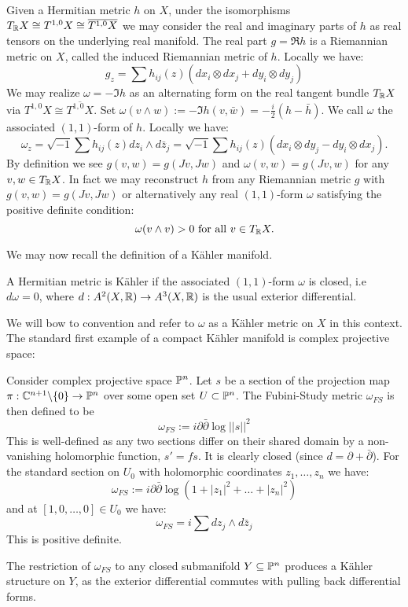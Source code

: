 Given a Hermitian metric \(h\) on \(X\), under the isomorphisms \(T_{\mathbb{R}} X \cong T^{1,0}X \cong \overline{T^{1,0}X}\) we may consider the real and imaginary parts of \(h\) as real tensors on the underlying real manifold. The real part \(g = \Re h\) is a Riemannian metric on \(X\), called the induced Riemannian metric of \(h\). Locally we have:
\[
g_z = \sum h_{ij}(z) ( dx_i \otimes d x_j + dy_i \otimes dy_j)
\]
We may realize \(\omega = - \Im h\) as an alternating form on the real tangent bundle \(T_{\mathbb{R}} X\) via \(T^{1,0}X \cong \overline{T^{1,0}X}\). Set \(\omega ( v \wedge w ) :=  - \Im h(v, \bar{w}) = - \frac{i}{2} ( h - \bar{h} )  \). We call \(\omega\) the associated \((1,1)\)-form of \(h\). Locally we have:
\[
\omega_z = \sqrt{-1} \sum h_{ij}(z) dz_i \wedge d\bar{z}_j = \sqrt{-1} \sum h_{ij}(z) ( dx_i \otimes dy_j - dy_i \otimes dx_j). 
\]
By definition we see \(g(v,w) = g(Jv,Jw)\) and \(\omega(v,w) = g(Jv,w) \) for any \(v,w \in T_{\mathbb{R}} X\). In fact we may reconstruct \(h\) from any Riemannian metric \(g\) with \(g(v,w) = g(Jv,Jw)\) or alternatively any real \((1,1)\)-form \(\omega\) satisfying the positive definite condition:
\[
\omega( v \wedge v)  > 0 \text{ for all } v \in T_{\mathbb{R}} X.
\]

We may now recall the definition of a K\"ahler manifold.
\begin{definition}
A Hermitian metric is K\"ahler if the associated \((1,1)\)-form \(\omega\) is closed, i.e \(d \omega = 0\), where \(d: A^2(X,\mathbb{R}) \to A^3(X,\mathbb{R})\) is the usual exterior differential.
\end{definition}
We will bow to convention and refer to \(\omega\) as a K\"ahler metric on \(X\) in this context. The standard first example of a compact K\"ahler manifold is complex projective space:
\begin{example}
Consider complex projective space \(\mathbb{P}^n\). Let \(s\) be a section of the projection map \(\pi: \mathbb{C}^{n+1} \backslash \{0\} \to \mathbb{P}^n\) over some open set \(U \subset \mathbb{P}^n\). The Fubini-Study metric \(\omega_{FS}\) is then defined to be
\[
\omega_{FS} := i \partial \bar{\partial} \log  ||s||^2
\]
This is well-defined as any two sections differ on their shared domain by a non-vanishing holomorphic function, \(s' = fs\). It is clearly closed (since \(d = \partial + \bar{\partial}\)). For the standard section on \(U_0\) with holomorphic coordinates \(z_1,\dots,z_n\) we have:
\[
\omega_{FS} := i \partial \bar{\partial} \log ( 1 + |z_1|^2 + \dots + |z_n|^2)
\]
and at \([1,0,\dots,0] \in U_0\) we have:
\[
\omega_{FS} = i \sum dz_j \wedge d \bar{z}_j
\]
This is positive definite.
\end{example}
\begin{example}
The restriction of \(\omega_{FS}\) to any closed submanifold \(Y \subseteq \mathbb{P}^n\) produces a K\"ahler structure on \(Y\), as the exterior differential commutes with pulling back differential forms.
\end{example}
